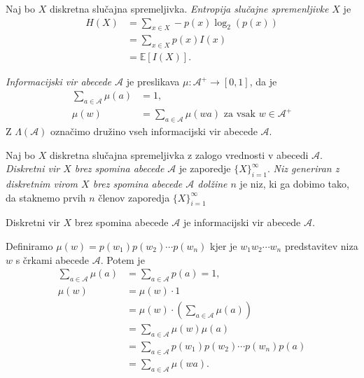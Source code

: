 \documentclass[fin1, tisk]{fmfdelo}
\newcommand{\E}{\mathbb{E}}
\newcommand{\A}{\mathcal{A}}
\theoremstyle{definition}
\begin{document}
\begin{definicija}
    Naj bo $X$ diskretna slučajna spremeljivka. \emph{Entropija slučajne spremenljivke $X$} je
    \begin{align*}
        H(X) &= \sum_{x \in X} - p(x) \log_2(p(x)) \\
             &= \sum_{x \in X} p(x) I(x) \\
             &= \E[I(X)].
    \end{align*}
\end{definicija}

\begin{definicija}
    \emph{Informacijski vir abecede $\A$} je preslikava $\mu \colon \A^+ \to [0,1]$, da je 
    \begin{align*}
        \sum_{a \in \A} \mu(a) &= 1, \\
        \mu(w) &= \sum_{a \in \A} \mu(wa) \text{ za vsak } w \in \A^+
    \end{align*}
    Z $\Lambda(\A)$ označimo družino vseh informacijski vir abecede $\A$.
\end{definicija}

\begin{definicija} %
    Naj bo $X$ diskretna slučajna spremeljivka z zalogo vrednosti v abecedi $\A$.
    \emph{Diskretni vir $X$ brez spomina abecede $\A$} je zaporedje $\{ X \}_{i=1}^{\infty}$.
    \emph{Niz generiran z diskretnim virom $X$ brez spomina abecede $\A$ dolžine $n$} je niz, ki 
    ga dobimo tako, da staknemo prvih $n$ členov zaporedja $\{ X \}_{i=1}^{\infty}$
\end{definicija}

\begin{trditev}
    Diskretni vir $X$ brez spomina abecede $\A$ je informacijski vir abecede $\A$.
\end{trditev}

\begin{dokaz}
    Definiramo $\mu(w) = p(w_1)p(w_2) \cdots p(w_n)$ kjer je $w_1w_2 \cdots w_n$ predstavitev niza
    $w$ s črkami abecede $\A$. Potem je
    \begin{align*}
        \sum_{a \in \A} \mu(a) &= \sum_{a \in \A} p(a) = 1, \\
        \mu(w) &= \mu(w) \cdot 1 \\
        &= \mu(w) \cdot \left( \sum_{a \in \A} \mu(a) \right) \\
        &= \sum_{a \in \A} \mu(w)\mu(a) \\
        &= \sum_{a \in \A} p(w_1) p(w_2) \cdots p(w_n) p(a) \\
        &= \sum_{a \in \A} \mu(wa).
    \end{align*}
\end{dokaz}
\end{document}
